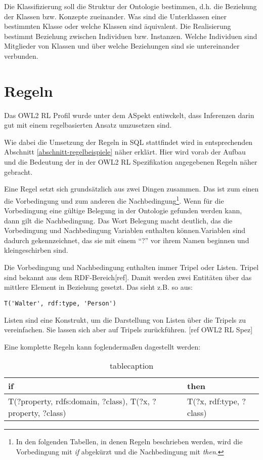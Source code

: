 Die Klassifizierung soll die Struktur der Ontologie bestimmen, d.h. die Beziehung der Klassen bzw. Konzepte zueinander. Was sind die Unterklassen einer bestimmten Klasse oder welche Klassen sind äquivalent.
Die Realisierung bestimmt Beziehung zwischen Individuen bzw. Instanzen. Welche Individuen sind Mitglieder von Klassen und über welche Beziehungen sind sie untereinander verbunden.

\section{Regeln}
Das OWL2 RL Profil wurde unter dem ASpekt entiwckelt, dass Inferenzen darin gut mit einem regelbasierten Ansatz umzusetzen sind.

Wie dabei die Umsetzung der Regeln in SQL stattfindet wird in entsprechenden Abschnitt \ref{abschnitt-regelbeispiele} näher erklärt. Hier wird vorab der Aufbau und die Bedeutung der in der OWL2 RL Spezifikation angegebenen Regeln näher gebracht.

Eine Regel setzt sich grundsätzlich aus zwei Dingen zusammen. Das ist zum einen die Vorbedingung und zum anderen die Nachbedingung\footnote{In den folgenden Tabellen, in denen Regeln beschrieben werden, wird die Vorbedingung mit \emph{if} abgekürzt und die Nachbedingung mit \emph{then}.}. Wenn für die Vorbedingung eine gültige Belegung in der Ontologie gefunden werden kann, dann gilt die Nachbedingung. Das Wort Belegung macht deutlich, das die Vorbedingung und Nachbedingung Variablen enthalten können.Variablen sind dadurch gekennzeichnet, das sie mit einem ``?'' vor ihrem Namen beginnen und kleingeschirben sind.

Die Vorbedingung und Nachbedingung enthalten immer Tripel oder Listen. Tripel sind bekannt aus dem RDF-Bereich[ref]. Damit werden zwei Entitäten über das mittlere Element in Beziehung gesetzt. Das sieht z.B. so aus:
\begin{verbatim}
T('Walter', rdf:type, 'Person')
\end{verbatim}
Listen sind eine Konstrukt, um die Darstellung von Listen über die Tripels zu vereinfachen. Sie lassen sich aber auf Tripels zurückführen. [ref OWL2 RL Spez]

Eine komplette Regeln kann foglendermaßen dagestellt werden:

\begin{table}[htp]
\begin{center}
\begin{tabular}{l|l}
if & then \\ \hline
T(?property, rdfs:domain, ?class), T(?x, ?property, ?class) & T(?x, rdf:type, ?class)
\end{tabular}
\end{center}
\caption{tablecaption}
\label{tablelabel}
\end{table}

